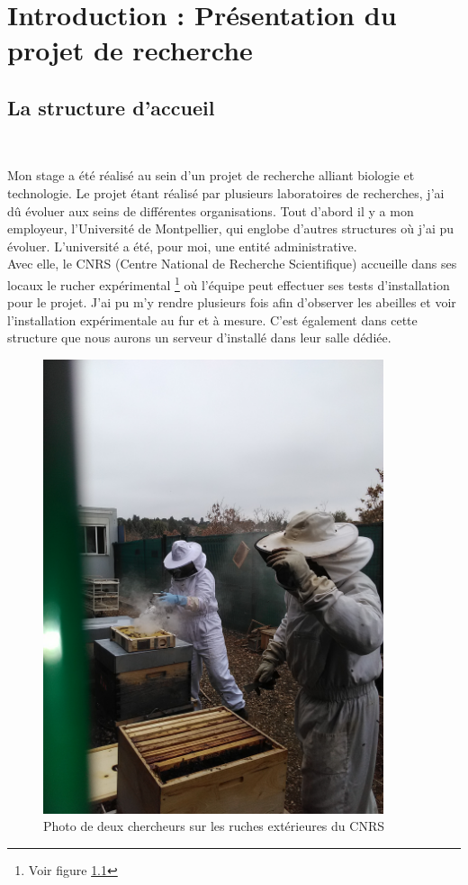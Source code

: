 \documentclass[11pt,french,a4paper]{report}
\begin{document}
\chapter{Introduction : Présentation du projet de recherche}
\section{La structure d'accueil} 

Mon stage a été réalisé au sein d'un projet de recherche alliant biologie et technologie. 
Le projet étant réalisé par plusieurs laboratoires de recherches, j'ai dû évoluer aux seins de différentes organisations. 
Tout d'abord il y a mon employeur, l'Université de Montpellier, qui englobe d'autres structures où j'ai pu évoluer. 
L'université a été, pour moi, une entité administrative. \\ 
Avec elle, le CNRS (Centre National de Recherche Scientifique) accueille dans ses locaux le rucher expérimental \footnote{Voir figure \ref{ruches_ext}}
où l'équipe peut effectuer ses tests d'installation pour le projet. 
J'ai pu m'y rendre plusieurs fois afin d'observer les abeilles
et voir l'installation expérimentale au fur et à mesure. C'est également dans cette structure que nous aurons un serveur 
d'installé dans leur salle dédiée.\\
\begin{figure}[!h]
\centering
\includegraphics[width=10cm]{../images/photo/IMG_20180215_123536.jpg}
\caption{Photo de deux chercheurs sur les ruches extérieures du CNRS}
\label{ruches_ext}
\end{figure}
\end{document}
